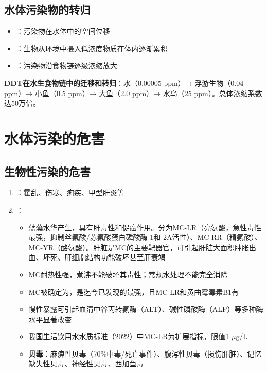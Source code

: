 \documentclass[10pt,a4paper,oneside]{ctexbook}
\begin{document}
\subsection{水体污染物的转归}

\begin{itemize}[leftmargin=*]
    \item {}：污染物在水体中的空间位移
    \item {}：生物从环境中摄入低浓度物质在体内逐渐累积
    \item {}：污染物沿食物链逐级浓缩放大
\end{itemize}

\begin{tipbox}
\textbf{DDT在水生食物链中的迁移和转归}：水（0.00005 ppm）→ 浮游生物（0.04 ppm）→ 小鱼（0.5 ppm）→ 大鱼（2.0 ppm）→ 水鸟（25 ppm）。总体浓缩系数达50万倍。
\end{tipbox}

\section{水体污染的危害}

\subsection{生物性污染的危害}

\begin{enumerate}[leftmargin=*]
    \item {}：霍乱、伤寒、痢疾、甲型肝炎等
    \item {}：
    \begin{itemize}
        \item 蓝藻水华产生，具有肝毒性和促癌作用。分为MC-LR（亮氨酸，急性毒性最强，抑制丝氨酸/苏氨酸蛋白磷酸酶-1和-2A活性）、MC-RR（精氨酸）、MC-YR（酪氨酸）。肝脏是MC的主要靶器官，可引起肝脏大面积肿胀出血、坏死、肝细胞结构功能破坏甚至肝衰竭
        \item MC耐热性强，煮沸不能破坏其毒性；常规水处理不能完全消除
        \item MC被确定为，是迄今已发现的最强，且MC-LR和黄曲霉毒素B1有
        \item 慢性暴露可引起血清中谷丙转氨酶（ALT）、碱性磷酸酶（ALP）等多种酶水平显著改变
        \item 我国生活饮用水水质标准（2022）中MC-LR为扩展指标，限值1 $\mu$g/L
        \item \textbf{贝毒}：麻痹性贝毒（70\%中毒/死亡事件）、腹泻性贝毒（损伤肝脏）、记忆缺失性贝毒、神经性贝毒、西加鱼毒
    \end{itemize}
\end{enumerate}
\end{document}

